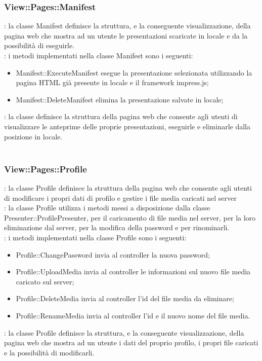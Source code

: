 {{		\subsubsection{View::Pages::Manifest}{
			\textbf{\tipo}: la classe Manifest definisce la struttura, e la conseguente visualizzazione, della pagina web che mostra ad un utente le presentazioni scaricate in locale e da la possibilità di eseguirle.\\
			\textbf{\interfacce}: i metodi implementati nella classe Manifest sono i seguenti:
			\begin{itemize}
				\item Manifest::ExecuteManifest esegue la presentazione selezionata utilizzando la pagina HTML già presente in locale e il framework impress.js;
				\item Manifest::DeleteManifest elimina la presentazione salvate in locale;
			\end{itemize} 
			\textbf{\attivita}: la classe definisce la struttura della pagina web che consente agli utenti di visualizzare le anteprime delle proprie presentazioni, eseguirle e eliminarle dalla posizione in locale.\\\\
		}
		\subsubsection{View::Pages::Profile}{
			\textbf{\tipo}: la classe Profile definisce la struttura della pagina web che consente agli utenti di modificare i propri dati di profilo e gestire i file media caricati nel server \\
			\textbf{\relaz}: la classe Profile utilizza i metodi messi a disposizione dalla classe Presenter::ProfilePresenter, per il caricamento di file media nel server, per la loro eliminazione dal server, per la modifica della password e per rinominarli.\\
			\textbf{\interfacce}: i metodi implementati nella classe Profile sono i seguenti:
			\begin{itemize}
				\item Profile::ChangePassword invia al controller la nuova password;
				\item Profile::UploadMedia invia al controller le informazioni sul nuovo file media caricato sul server;
				\item Profile::DeleteMedia invia al controller l'id del file media da eliminare;
				\item Profile::RenameMedia invia al controller l'id e il nuovo nome del file media.
			\end{itemize}
			\textbf{\attivita}: la classe Profile definisce la struttura, e la conseguente visualizzazione, della pagina web che mostra ad un utente i dati del proprio profilo, i propri file caricati e la possibilità di modificarli.\\
		}
}}
